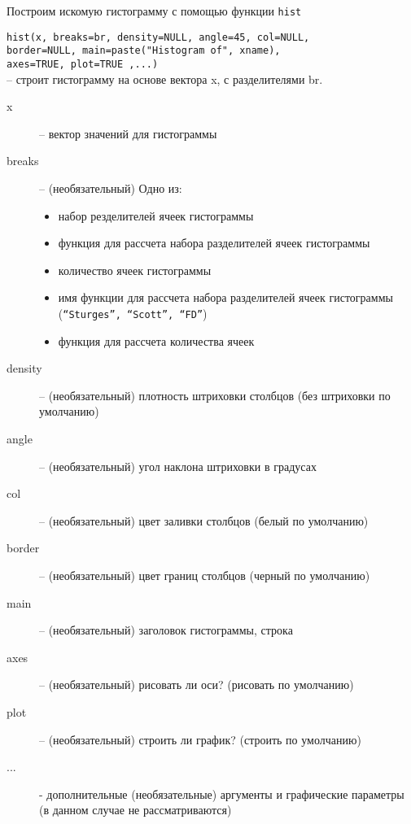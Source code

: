 \begin{enumerate}
		Построим искомую гистограмму с помощью функции \texttt{hist}
		\begin{mdframed}[style=BadassFrame]
			\texttt{hist(x, breaks=br, density=NULL, angle=45, col=NULL, \\
				\phantom{    } border=NULL, main=paste("Histogram of", xname), \\
				\phantom{    } axes=TRUE, plot=TRUE ,...)} \\
				-- строит гистограмму на основе вектора x, с разделителями br.
			\begin{description}

				\item[x] -- вектор значений для гистограммы
				\item[breaks] -- (необязательный) Одно из:

					\begin{itemize}

						\item набор резделителей ячеек гистограммы
						\item функция для рассчета набора разделителей ячеек гистограммы
						\item количество ячеек гистограммы
						\item имя функции для рассчета набора разделителей ячеек гистограммы \\
							(\texttt{``Sturges'', ``Scott'', ``FD''}) 
						\item функция для рассчета количества ячеек
					\end{itemize}
				\item[density] -- (необязательный) плотность штриховки столбцов (без штриховки по умолчанию)
				\item[angle] -- (необязательный) угол наклона штриховки в градусах
				\item[col] -- (необязательный) цвет заливки столбцов (белый по умолчанию)
				\item[border] -- (необязательный) цвет границ столбцов (черный по умолчанию)
				\item[main] -- (необязательный) заголовок гистограммы, строка
				\item[axes] -- (необязательный) рисовать ли оси? (рисовать по умолчанию)
				\item[plot] -- (необязательный) строить ли график? (строить по умолчанию)
				\item[...] - дополнительные (необязательные) аргументы и графические параметры 
					(в данном случае не рассматриваются)
			\end{description}
		\end{mdframed}


\end{enumerate}
